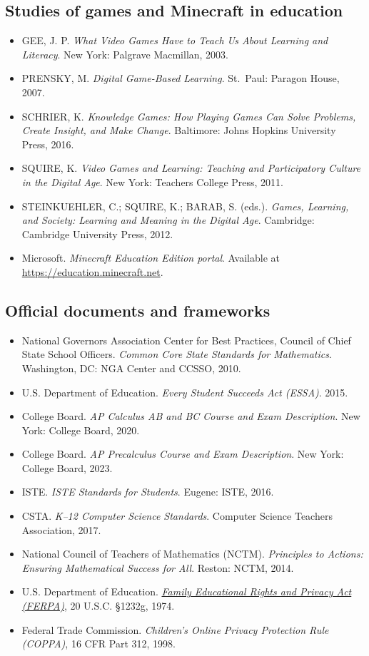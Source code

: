 \documentclass[12pt,a4paper]{scrartcl}
\begin{document}
\subsection{Studies of games and Minecraft in education}
\begin{itemize}[leftmargin=1.3em,itemsep=0.15em,topsep=0.3em]
  \item GEE, J. P. \emph{What Video Games Have to Teach Us About Learning and Literacy}. New York: Palgrave Macmillan, 2003.
  \item PRENSKY, M. \emph{Digital Game-Based Learning}. St.\ Paul: Paragon House, 2007.
  \item SCHRIER, K. \emph{Knowledge Games: How Playing Games Can Solve Problems, Create Insight, and Make Change}. Baltimore: Johns Hopkins University Press, 2016.
  \item SQUIRE, K. \emph{Video Games and Learning: Teaching and Participatory Culture in the Digital Age}. New York: Teachers College Press, 2011.
  \item STEINKUEHLER, C.; SQUIRE, K.; BARAB, S. (eds.). \emph{Games, Learning, and Society: Learning and Meaning in the Digital Age}. Cambridge: Cambridge University Press, 2012.
  \item Microsoft. \emph{Minecraft Education Edition portal}. Available at \url{https://education.minecraft.net}.
\end{itemize}

\subsection{Official documents and frameworks}
\begin{itemize}[leftmargin=1.3em,itemsep=0.15em,topsep=0.3em]
  \item National Governors Association Center for Best Practices, Council of Chief State School Officers. \emph{Common Core State Standards for Mathematics}. Washington, DC: NGA Center and CCSSO, 2010.
  \item U.S. Department of Education. \emph{Every Student Succeeds Act (ESSA)}. 2015.
  \item College Board. \emph{AP Calculus AB and BC Course and Exam Description}. New York: College Board, 2020.
  \item College Board. \emph{AP Precalculus Course and Exam Description}. New York: College Board, 2023.
  \item ISTE. \emph{ISTE Standards for Students}. Eugene: ISTE, 2016.
  \item CSTA. \emph{K--12 Computer Science Standards}. Computer Science Teachers Association, 2017.
  \item National Council of Teachers of Mathematics (NCTM). \emph{Principles to Actions: Ensuring Mathematical Success for All}. Reston: NCTM, 2014.
  \item U.S. Department of Education. \href{https://studentprivacy.ed.gov/}{\emph{Family Educational Rights and Privacy Act (FERPA)}}, 20 U.S.C. §1232g, 1974.
  \item Federal Trade Commission. \emph{Children's Online Privacy Protection Rule (COPPA)}, 16 CFR Part 312, 1998.
\end{itemize}
\end{document}
